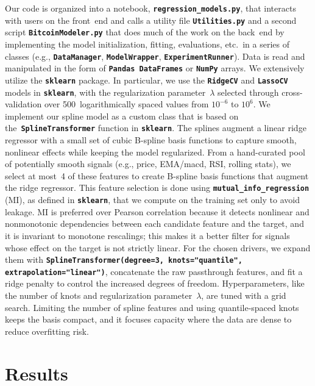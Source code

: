 \documentclass{article}
\begin{document}
Our code is organized into a notebook, \textbf{\texttt{regression\_models.py}}, that interacts with users on the front~end and calls a utility file \textbf{\texttt{Utilities.py}} and a second script \textbf{\texttt{BitcoinModeler.py}} that does much of the work on the back~end by implementing the model initialization, fitting, evaluations, etc.\ in a series of classes (e.g., \textbf{\texttt{DataManager}}, \textbf{\texttt{ModelWrapper}}, \textbf{\texttt{ExperimentRunner}}). Data is read and manipulated in the form of \textbf{\texttt{Pandas DataFrames}} or \textbf{\texttt{NumPy}} arrays. We extensively utilize the \textbf{\texttt{sklearn}} package. In particular, we use the \textbf{\texttt{RidgeCV}} and \textbf{\texttt{LassoCV}} models in \textbf{\texttt{sklearn}}, with the regularization parameter~$\lambda$ selected through cross-validation over 500~logarithmically spaced values from $10^{-6}$ to $10^6$. We implement our spline model as a custom class that is based on the~\textbf{\texttt{SplineTransformer}} function in \textbf{\texttt{sklearn}}. The splines augment a linear ridge regressor with a small set of cubic B-spline basis functions to capture smooth, nonlinear effects while keeping the model regularized. From a hand-curated pool of potentially smooth signals (e.g., price, EMA/macd, RSI, rolling stats), we select at most~4 of these features to create B-spline basis functions that augment the ridge regressor. This feature selection is done using \textbf{\texttt{mutual\_info\_regression}} (MI), as defined in \textbf{\texttt{sklearn}}, that we compute on the training set only to avoid leakage. MI is preferred over Pearson correlation because it detects nonlinear and nonmonotonic dependencies between each candidate feature and the target, and it is invariant to monotone rescalings; this makes it a better filter for signals whose effect on the target is not strictly linear. For the chosen drivers, we expand them with \textbf{\texttt{SplineTransformer(degree=3, knots="quantile", extrapolation="linear")}}, concatenate the raw passthrough features, and fit a ridge penalty to control the increased degrees of freedom. Hyperparameters, like the number of knots and regularization parameter~$\lambda$, are tuned with a grid search. Limiting the number of spline features and using quantile-spaced knots keeps the basis compact, and it focuses capacity where the data are dense to reduce overfitting risk.

\section{Results}
\label{sec:results}
\end{document}
